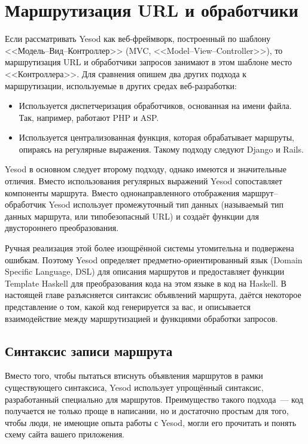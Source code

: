 \chapter{Маршрутизация URL и обработчики}\label{chap:routing}

Если рассматривать Yesod как веб-фреймворк, построенный по шаблону
<<Модель--Вид--Контроллер>> (MVC, <<Model--View--Controller>>), то маршрутизация URL и
обработчики запросов занимают в этом шаблоне место <<Контроллера>>. Для сравнения опишем
два других подхода к маршрутизации, используемые в других средах веб-разработки:
\begin{itemize}
\item Используется диспетчеризация обработчиков, основанная на имени файла. Так, например,
  работают PHP и ASP.
\item Используется централизованная функция, которая обрабатывает маршруты, опираясь на
  регулярные выражения. Такому подходу следуют Django и Rails.
\end{itemize}

Yesod в основном следует второму подходу, однако имеются и значительные отличия. Вместо
использования регулярных выражений Yesod сопоставляет компоненты маршрута. Вместо
однонаправленного отображения маршрут--обработчик Yesod использует промежуточный тип
данных (называемый тип данных маршрута, или типобезопасный URL) и создаёт функции для
двустороннего преобразования.

Ручная реализация этой более изощрённой системы утомительна и подвержена ошибкам. Поэтому
Yesod определяет предметно-ориентированный язык (Domain Specific Language, DSL) для
описания маршрутов и предоставляет функции Template Haskell для преобразования кода на
этом языке в код на Haskell. В настоящей главе разъясняется синтаксис объявлений маршрута,
даётся некоторое представление о том, какой код генерируется за вас, и описывается
взаимодействие между маршрутизацией и функциями обработки запросов.

\section{Синтаксис записи маршрута}

Вместо того, чтобы пытаться втиснуть объявления маршрутов в рамки существующего
синтаксиса, Yesod использует упрощённый синтаксис, разработанный специально для
маршрутов. Преимущество такого подхода~--- код получается не только проще в написании, но
и достаточно простым для того, чтобы люди, не имеющие опыта работы с Yesod, могли
его прочитать и понять схему сайта вашего приложения.

